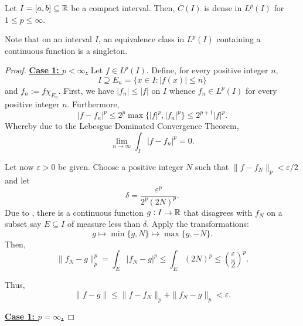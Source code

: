 \begin{lemma}
    Let $I = [a,b]\subseteq\mathbb{R}$ be a compact interval. Then, $C(I)$ is dense in $L^p(I)$ for $1\le p\le\infty$.
\end{lemma}
Note that on an interval $I$, an equivalence class in $L^p(I)$ containing a continuous function is a singleton.
\begin{proof}
    \underline{\bfseries Case 1: $p < \infty$.} Let $f\in L^p(I)$. Define, for every positive integer $n$,
    \begin{equation*}
        I\supseteq E_n = \{x\in I\colon |f(x)|\le n\}
    \end{equation*}
    and $f_n := f\chi_{E_n}$. First, we have $|f_n|\le|f|$ on $I$ whence $f_n\in L^p(I)$ for every positive integer $n$. Furthermore, 
    \begin{equation*}
        |f - f_n|^p\le 2^p\max\{|f|^p, |f_n|^p\}\le 2^{p + 1}|f|^p.
    \end{equation*}
    Whereby due to the Lebesgue Dominated Convergence Theorem, 
    \begin{equation*}
        \lim_{n\to\infty}\int_I |f - f_n|^p = 0.
    \end{equation*}

    Let now $\varepsilon > 0$ be given. Choose a positive integer $N$ such that $\|f - f_N\|_p < \varepsilon/2$ and let 
    \begin{equation*}
        \delta = \frac{\varepsilon^p}{2^p(2N)^p}.
    \end{equation*}
    Due to , there is a continuous function $g: I\to\mathbb{R}$ that disagrees with $f_N$ on a subset say $E\subseteq I$ of measure less than $\delta$. Apply the transformations: 
    \begin{equation*}
        g\mapsto\min\{g, N\}\mapsto\max\{g,-N\}.
    \end{equation*}
    Then, 
    \begin{equation*}
        \|f_N - g\|_p^p = \int_E|f_N - g|^p\le\int_E(2N)^p\le\left(\frac{\varepsilon}{2}\right)^p.
    \end{equation*}

    Thus, 
    \begin{equation*}
        \|f - g\|\le\|f - f_N\|_p + \|f_N - g\|_p < \varepsilon.
    \end{equation*}

    \underline{\bfseries Case 1: $p = \infty$.}
\end{proof}

